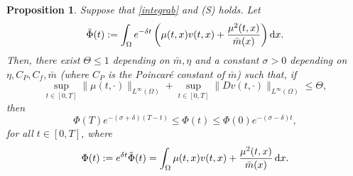 \documentclass[10pt,a4paper,nouppercase,nowrite]{article}
\numberwithin{equation}{section}
\newcommand{\di}{{\rm d}}
\newcommand{\Sp}{{\textsc (S)} }
\newtheorem{prop}[defn]{Proposition}
\theoremstyle{definition}
\begin{document}
	\begin{prop} \label{phinl1}
		Suppose that \eqref{integrab} and \Sp holds. Let  
		$$\tilde{\Phi}(t):=\int_{\Omega}e^{-\delta t} \left( \mu(t,x) v(t,x) + \frac{\mu^2(t,x)}{\bar{m}(x)} \right) \di x.$$
		Then, there exist $\Theta \le 1$ depending on $\bar{m}, \eta$ and a constant $\sigma > 0$ depending on $\eta,C_P,C_f,\bar{m}$ (where $C_P$ is the Poincar\'e constant of $\bar{m}$) such that, if
		$$\sup_{t \in [0,T]}\|\mu(t,\cdot)\|_{L^\infty(\Omega)} + \sup_{t \in [0,T]} \| Dv(t,\cdot) \|_{L^\infty(\Omega)} \le \Theta,$$
		then
		\begin{equation}
			\Phi(T) e^{-(\sigma+\delta)(T-t)} \le \Phi(t) \le \Phi(0)e^{-(\sigma-\delta) t},
			\label{phidelta}
		\end{equation}
		for all $t \in [0,T]$, where
		\begin{equation*}
			\Phi(t):=e^{\delta t} \tilde{\Phi}(t) = \int_{\Omega} \mu(t,x) v(t,x) + \frac{\mu^2(t,x)}{\bar{m}(x)} \, \di x.
		\end{equation*}
	\end{prop}
\end{document}
